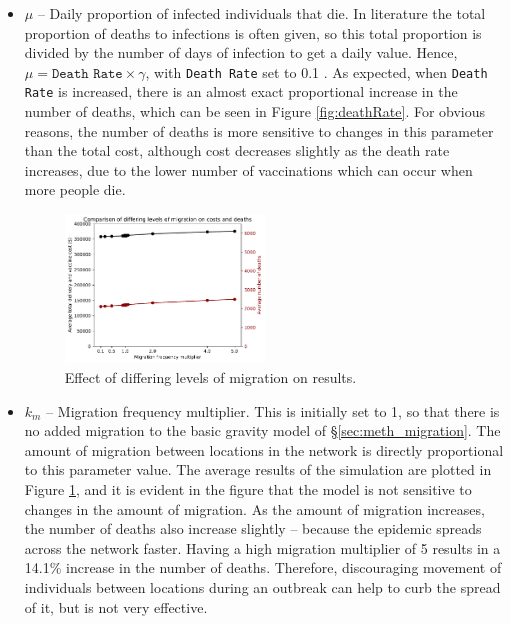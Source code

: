 \begin{itemize}
    \item $\mu$ -- Daily proportion of infected individuals that die. In literature the total proportion of deaths to infections is often given, so this total proportion is divided by the number of days of infection to get a daily value. Hence, $\mu = \texttt{Death Rate} \times \gamma$, with \texttt{Death Rate} set to 0.1 \cite{moss2007measles}. As expected, when \texttt{Death Rate} is increased, there is an almost exact proportional increase in the number of deaths, which can be seen in Figure \ref{fig:deathRate}. For obvious reasons, the number of deaths is more sensitive to changes in this parameter than the total cost, although cost decreases slightly as the death rate increases, due to the lower number of vaccinations which can occur when more people die.
    
    \begin{figure}[]
    \centering
    \includegraphics[width=0.5\textwidth, trim={0 0 0 0.67cm}, clip]{Figures/migrationFreq.pdf}
    \caption{Effect of differing levels of migration on results.}
    \label{fig:migrationFreq}
    \end{figure}
    
    \item $k_{m}$ -- Migration frequency multiplier. This is initially set to 1, so that there is no added migration to the basic gravity model of \S \ref{sec:meth_migration}. The amount of migration between locations in the network is directly proportional to this parameter value. The average results of the simulation are plotted in Figure \ref{fig:migrationFreq}, and it is evident in the figure that the model is not sensitive to changes in the amount of migration. As the amount of migration increases, the number of deaths also increase slightly -- because the epidemic spreads across the network faster. Having a high migration multiplier of 5 results in a 14.1\% increase in the number of deaths. Therefore, discouraging movement of individuals between locations during an outbreak can help to curb the spread of it, but is not very effective.
\end{itemize}

